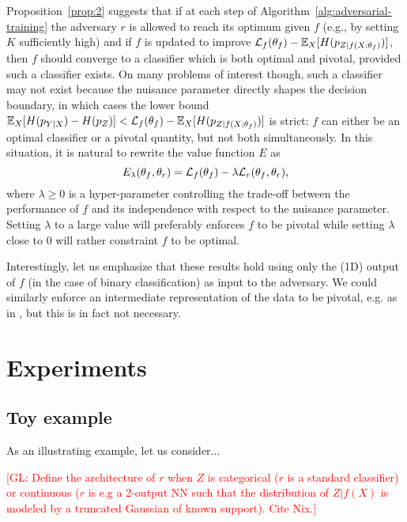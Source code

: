 \documentclass[twocolumn,superscriptaddress,aps]{revtex4-1}
\newcommand{\glnote}[1]{\textcolor{red}{[GL: #1]}}
\theoremstyle{plain}
\begin{document}
Proposition~\ref{prop:2} suggests that if at each step of
Algorithm~\ref{alg:adversarial-training} the adversary $r$ is allowed to reach
its optimum given $f$ (e.g., by setting $K$ sufficiently high) and if $f$ is
updated to improve ${\cal L}_f(\theta_f) - \mathbb{E}_X [ H(p_{Z|f(X;\theta_f)}) ]$, then $f$
should converge to a classifier which is both optimal and pivotal, provided such
a classifier exists. On many problems of interest though, such a classifier may
not exist because the nuisance parameter directly shapes the decision boundary,
in which cases the lower bound $\mathbb{E}_{X} [ H(p_{Y|X}) - H(p_Z)] < {\cal L}_f(\theta_f) - \mathbb{E}_{X} [H(p_{Z|f(X;\theta_f)})]$ is strict: $f$ can either be an optimal classifier or a
pivotal quantity, but not both simultaneously. In this situation, it is natural
to rewrite the value function $E$  as
\begin{equation}
    E_\lambda(\theta_f, \theta_r) = {\cal L}_f(\theta_f) - \lambda {\cal L}_r(\theta_f, \theta_r),
\end{equation}
where $\lambda \geq 0$ is a hyper-parameter controlling the trade-off between
the performance of $f$ and its independence with respect to the nuisance
parameter. Setting $\lambda$ to a large value will preferably enforces $f$ to
be pivotal while setting $\lambda$ close to $0$ will rather constraint $f$ to be
optimal.

Interestingly, let us emphasize that these results hold using only the (1D) output
of $f$ (in the case of binary classification) as input to the adversary. We
could similarly enforce an intermediate representation of the data to be
pivotal, e.g. as in \citep{ganin2014unsupervised}, but this is in fact not
necessary.



\section{Experiments}

\subsection{Toy example}

As an illustrating example, let us consider...

\glnote{Define the architecture of $r$ when $Z$ is categorical ($r$ is a
standard classifier) or continuous ($r$ is e.g a 2-output NN such that the
distribution of $Z|f(X)$ is modeled by a truncated Gaussian of known support). Cite Nix.}
\end{document}
